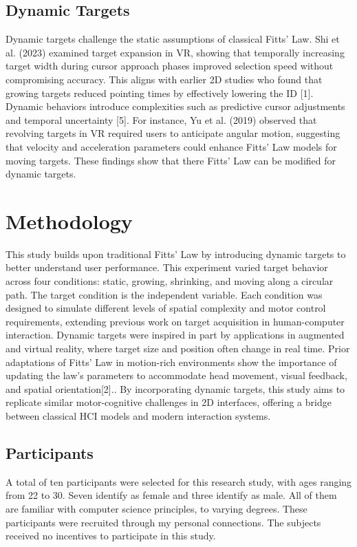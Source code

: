 \documentclass[acmlarge]{acmart}
\begin{document}
\subsection{Dynamic Targets}
Dynamic targets challenge the static assumptions of classical Fitts’ Law. Shi et al. (2023) examined target expansion in VR, showing that temporally increasing target width during cursor approach phases improved selection speed without compromising accuracy. This aligns with earlier 2D studies who found that growing targets reduced pointing times by effectively lowering the ID [1]. Dynamic behaviors introduce complexities such as predictive cursor adjustments and temporal uncertainty [5]. For instance, Yu et al. (2019) observed that revolving targets in VR required users to anticipate angular motion, suggesting that velocity and acceleration parameters could enhance Fitts’ Law models for moving targets. These findings show that there Fitts’ Law can be modified for dynamic targets.



\section{Methodology}
This study builds upon traditional Fitts’ Law by introducing dynamic targets to better understand user performance. This experiment varied target behavior across four conditions: static, growing, shrinking, and moving along a circular path. The target condition is the independent variable. Each condition was designed to simulate different levels of spatial complexity and motor control requirements, extending previous work on target acquisition in human-computer interaction.
Dynamic targets were inspired in part by applications in augmented and virtual reality, where target size and position often change in real time. Prior adaptations of Fitts’ Law in motion-rich environments show the importance of updating the law’s parameters to accommodate head movement, visual feedback, and spatial orientation[2].. By incorporating dynamic targets, this study aims to replicate similar motor-cognitive challenges in 2D interfaces, offering a bridge between classical HCI models and modern interaction systems.
\subsection{Participants}
A total of ten participants were selected for this research study, with ages ranging from 22 to 30. Seven identify as female and three identify as male. All of them are familiar with computer science principles, to varying degrees. These participants were recruited through my personal connections. The subjects received no incentives to participate in this study.
\end{document}
